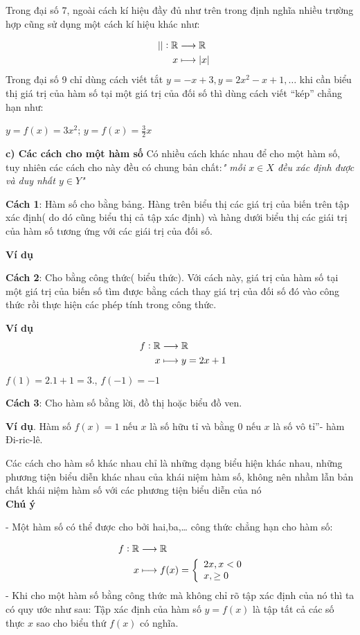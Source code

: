 \documentclass[12pt,oneside,a4paper,reqno]{book}
\begin{document}
        Trong đại số 7, ngoài cách kí hiệu đầy đủ như trên trong định nghĩa nhiều trường hợp cũng sử dụng một cách kí hiệu khác như:
        
\begin{align*}
\text{ \space}\left|\right|:\mathbb{R}&\longrightarrow \mathbb{R}\\
x&\longmapsto\left|x\right|
\end{align*}
Trong đại số 9 chỉ dùng cách viết tắt $y=-x+3,y=2x^2-x+1,…$ khi cần biểu thị giá trị của hàm số tại một giá trị của đối số thì dùng cách viết “kép” chẳng hạn như:

           $ y=f(x)=3x^2$;      $y=f(x)=\frac{3}{2}x$
           
{\bf c)  Các cách cho một hàm số}
Có nhiều cách khác nhau để cho một hàm số, tuy nhiên các cách cho này đều có chung bản chất:\textit{" mỗi $x \in X$ đều xác định được và duy nhất $y \in Y$"}

{\bf Cách 1}: Hàm số cho bằng bảng. Hàng trên biểu thị các giá trị của biến trên tập xác định( do dó cũng biểu thị cả tập xác định) và hàng dưới biểu thị các giái trị của hàm số tương ứng với các giái trị của đối số.

{\bf Ví dụ}

{\bf Cách 2}: Cho bằng công thức( biểu thức). Với cách này, giá trị của hàm số tại một giá trị của biến số tìm được bằng cách thay giá trị của đối số đó vào công thức rồi thực hiện các phép tính trong công thức.

{\bf Ví dụ}
\begin{align*}
\text{ \space}f:\mathbb{R}&\longrightarrow \mathbb{R}\\
x&\longmapsto y=2x+1
\end{align*}
$f(1)=2.1+1=3.$, $f(-1)=-1$

{\bf Cách 3}: Cho hàm số bằng lời, đồ thị hoặc biểu đồ ven.

{\bf Ví dụ}. Hàm số $f(x)=1$ nếu $x$ là số hữu tỉ và bằng 0 nếu $x$ là số vô tỉ”- hàm Đi-ric-lê.

Các cách cho hàm số khác nhau chỉ là những dạng biểu hiện khác nhau, những phương tiện biểu diễn khác nhau của khái niệm hàm số, không nên nhầm lẫn bản chất khái niệm hàm số với các phương tiện biểu diễn của nó\\
{\bf Chú ý}

-  Một hàm số có thể được cho bởi hai,ba,… công thức chẳng hạn cho hàm số:

\begin{align*}
\text{ \space}f:\mathbb{R}&\longrightarrow \mathbb{R}\\
x&\longmapsto f(x)=\left\{ \begin{array}{l}
2x  ,  x<0\\
x  ,   \ge 0
\end{array} \right.
\end{align*}
- Khi cho một hàm số bằng công thức mà không chỉ rõ tập xác định của nó thì ta có quy ước như sau: Tập xác định của hàm số $y=f(x)$ là tập tất cả các số thực $x$ sao cho biểu thứ $f(x)$ có nghĩa.
\end{document}
